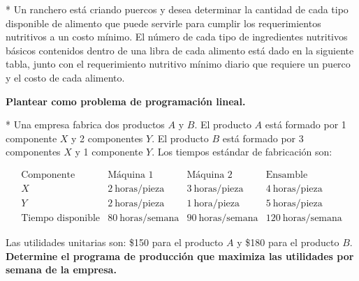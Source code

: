\begin{Quest}*\label{Pregunta17}
Un ranchero est\'a criando puercos y desea determinar la cantidad de cada tipo disponible de alimento que puede servirle para cumplir los requerimientos nutritivos a un costo m\'inimo. El n\'umero de cada tipo de ingredientes nutritivos b\'asicos contenidos dentro de una libra de cada alimento est\'a dado en la siguiente tabla, junto con el requerimiento nutritivo m\'inimo diario que requiere un puerco y el costo de cada alimento.
\begin{table}[h]
\centering
{}
\end{table}
\textbf{Plantear como problema de programaci\'on lineal.}

\end{Quest}


\begin{Quest}*\label{Pregunta18}
Una empresa fabrica dos productos $A$ y $B$. El producto $A$ est\'a formado por 1 componente $X$ y 2 componentes $Y$. El producto $B$ est\'a formado por 3 componentes $X$ y 1 componente $Y$. Los tiempos est\'andar de fabricaci\'on son:

\[
\begin{array}{l|ccc}
\text{Componente} & \text{M\'aquina 1} & \text{M\'aquina 2} & \text{Ensamble} \\
\hline
X & 2\ \text{horas/pieza} & 3\ \text{horas/pieza} & 4\ \text{horas/pieza} \\
Y & 2\ \text{horas/pieza} & 1\ \text{hora/pieza} & 5\ \text{horas/pieza} \\
\hline
\text{Tiempo disponible} & 80\ \text{horas/semana} & 90\ \text{horas/semana} & 120\ \text{horas/semana}
\end{array}
\]

Las utilidades unitarias son: \$150 para el producto $A$ y \$180 para el producto $B$. \textbf{Determine el programa de producci\'on que maximiza las utilidades por semana de la empresa.}

\end{Quest}


